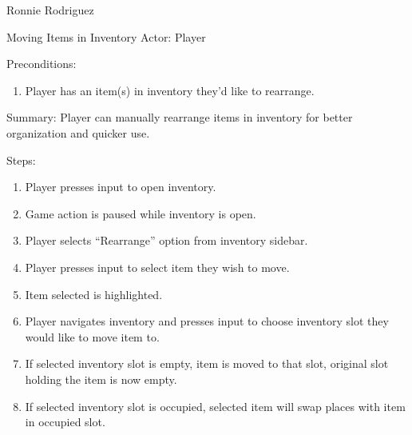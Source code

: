 \documentclass[12pt]{report}
\begin{document}
\begin{section}{Ronnie Rodriguez}
\begin{subsection}{Moving Items in Inventory}
Actor: Player

Preconditions:
\begin{enumerate}
\item Player has an item(s) in inventory they'd like to rearrange.
\end{enumerate}

Summary: Player can manually rearrange items in inventory for better
organization and quicker use.

Steps:
\begin{enumerate}
\item Player presses input to open inventory.
\item Game action is paused while inventory is open.
\item Player selects ``Rearrange'' option from inventory sidebar.
\item Player presses input to select item they wish to move.
\item Item selected is highlighted.
\item Player navigates inventory and presses input to choose inventory slot
they would like to move item to.
\item If selected inventory slot is empty, item is moved to that slot,
original slot holding the item is now empty.
\item If selected inventory slot is occupied, selected item will swap places
with item in occupied slot. 
\end{enumerate}
\end{subsection}
\end{section}
\end{document}
